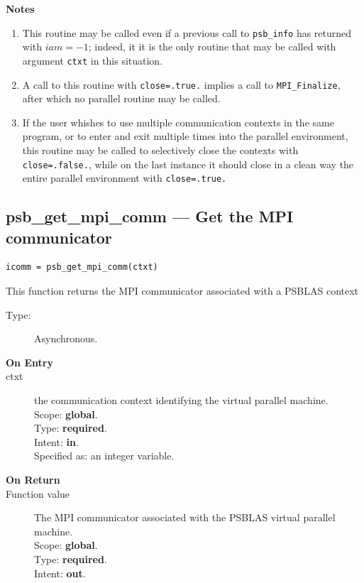 {\par\noindent\large\bfseries Notes}
\begin{enumerate}
\item This routine may be called even if a previous call to
  \verb|psb_info| has returned with $iam=-1$; indeed, it it is the only
  routine that may be called with argument \verb|ctxt| in this
  situation.
\item A call to this routine with \verb|close=.true.| implies a call
  to \verb|MPI_Finalize|, after which no parallel routine may be called.
\item If the user whishes to use multiple communication contexts in the
  same program, or to enter and exit multiple times into the parallel
  environment, this routine may be called to 
  selectively close the contexts with \verb|close=.false.|, while on
  the last instance it should close in a clean way the entire
  parallel environment with \verb|close=.true.|
  
\end{enumerate}


\clearpage\subsection{psb\_get\_mpi\_comm --- Get the MPI communicator}

\begin{verbatim}
icomm = psb_get_mpi_comm(ctxt)
\end{verbatim}

This function returns the MPI communicator associated with a PSBLAS context
\begin{description}
\item[Type:] Asynchronous.
\item[\bf  On Entry ]
\item[ctxt] the communication context identifying the virtual
  parallel machine.\\
Scope: {\bf global}.\\
Type: {\bf required}.\\
Intent: {\bf in}.\\
Specified as: an integer variable.
\end{description}

\begin{description}
\item[\bf On Return]
\item[Function value] The MPI communicator associated with the  PSBLAS virtual parallel machine.\\
Scope: {\bf global}.\\
Type: {\bf required}.\\
Intent: {\bf out}.\\
\end{description}

